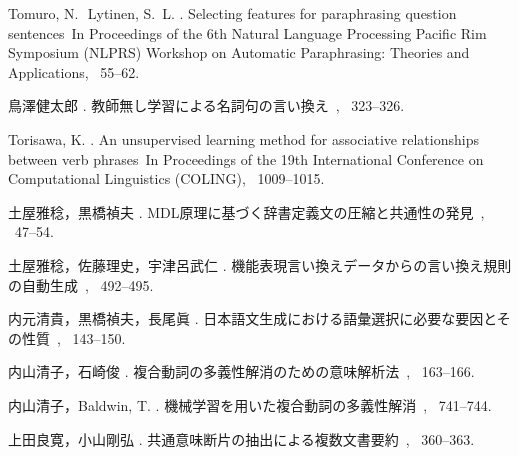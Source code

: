 \begin{thebibliography}{}
Tomuro, N.\,\BBA\ Lytinen, S.~L. \BBCP.
\newblock \BBOQ Selecting features for paraphrasing question sentences\BBCQ\
\newblock In {\Bem Proceedings of the 6th Natural Language Processing Pacific
  Rim Symposium {\rm (}NLPRS\/{\rm )} Workshop on Automatic Paraphrasing:
  Theories and Applications}, \BPGS\ 55--62.

鳥澤健太郎 \BBCP.
\newblock \JBOQ 教師無し学習による名詞句の言い換え\JBCQ\
\newblock {}, \BPGS\ 323--326.

Torisawa, K. \BBOP 2002\BBCP.
\newblock \BBOQ An unsupervised learning method for associative relationships
  between verb phrases\BBCQ\
\newblock In {\Bem Proceedings of the 19th International Conference on
  Computational Linguistics {\rm (}COLING\/{\rm )}}, \BPGS\ 1009--1015.

土屋雅稔，黒橋禎夫 \BBOP 2000\BBCP.
\newblock \JBOQ MDL原理に基づく辞書定義文の圧縮と共通性の発見\JBCQ\
\newblock {}, \BPGS\ 47--54.

土屋雅稔，佐藤理史，宇津呂武仁 \BBOP 2004\BBCP.
\newblock \JBOQ 機能表現言い換えデータからの言い換え規則の自動生成\JBCQ\
\newblock {}, \BPGS\ 492--495.

内元清貴，黒橋禎夫，長尾眞 \BBOP 1996\BBCP.
\newblock \JBOQ 日本語文生成における語彙選択に必要な要因とその性質\JBCQ\
\newblock {}, \BPGS\ 143--150.

内山清子，石崎俊 \BBCP.
\newblock \JBOQ 複合動詞の多義性解消のための意味解析法\JBCQ\
\newblock {}, \BPGS\ 163--166.

内山清子，Baldwin, T. \BBOP 2004\BBCP.
\newblock \JBOQ 機械学習を用いた複合動詞の多義性解消\JBCQ\
\newblock {}, \BPGS\ 741--744.

上田良寛，小山剛弘 \BBOP 2000\BBCP.
\newblock \JBOQ 共通意味断片の抽出による複数文書要約\JBCQ\
\newblock {}, \BPGS\ 360--363.


\end{thebibliography}
